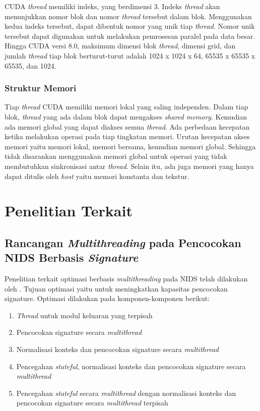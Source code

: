       CUDA \emph{thread} memiliki indeks, yang berdimensi 3. Indeks \emph{thread} akan menunjukkan nomor blok dan nomor \emph{thread} tersebut dalam blok. Menggunakan kedua indeks tersebut, dapat dibentuk nomor yang unik tiap \emph{thread}. Nomor unik tersebut dapat digunakan untuk melakukan pemrosesan paralel pada data besar. Hingga CUDA versi 8.0, maksimum dimensi blok \emph{thread}, dimensi grid, dan jumlah \emph{thread} tiap blok berturut-turut adalah 1024 x 1024 x 64, 65535 x 65535 x 65535, dan 1024.

    \subsubsection{Struktur Memori}

      Tiap \emph{thread} CUDA memiliki memori lokal yang saling independen. Dalam tiap blok, \emph{thread} yang ada dalam blok dapat mengakses \emph{shared memory}. Kemudian ada memori global yang dapat diakses semua \emph{thread}. Ada perbedaan kecepatan ketika melakukan operasi pada tiap tingkatan memori. Urutan kecepatan akses memori yaitu memori lokal, memori bersama, kemudian memori global. Sehingga tidak disarankan menggunakan memori global untuk operasi yang tidak membutuhkan sinkronisasi antar \emph{thread}. Selain itu, ada juga memori yang hanya dapat ditulis oleh \emph{host} yaitu memori konstanta dan tekstur.

\section{Penelitian Terkait}

  \subsection{Rancangan \emph{Multithreading} pada Pencocokan NIDS Berbasis \emph{Signature}} 

    Penelitian terkait optimasi berbasis \emph{multithreading} pada NIDS telah dilakukan oleh \citep{multi2004}. Tujuan optimasi yaitu untuk meningkatkan kapasitas pencocokan signature. Optimasi dilakukan pada komponen-komponen berikut:

    \begin{enumerate}
      \item \emph{Thread} untuk modul keluaran yang terpisah
      \item Pencocokan signature secara \emph{multithread}
      \item Normalisasi konteks dan pencocokan signature secara \emph{multithread}
      \item Pencegahan \emph{stateful}, normalisasi konteks dan pencocokan signature secara \emph{multithread}
      \item Pencegahan \emph{stateful} secara \emph{multithread} dengan normalisasi konteks dan pencocokan signature secara \emph{multithread} terpisah
    \end{enumerate}

